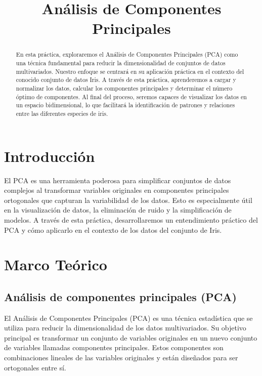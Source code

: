 \documentclass[conference]{IEEEtran}
\title{Análisis de Componentes Principales}
\author{
\IEEEauthorblockN{Portilla Posadas F. D.\textsuperscript{1}}
\IEEEauthorblockA{
\textit{Ingeniería en Inteligencia Artificial} \\
\textit{Unidad Profesional Interdisciplinaria de Ingeniería, Campus Tlaxcala, Instituto Politécnico Nacional}\\
Tlaxacala, México\\
fportillap2100@alumno.ipn.mx
}
}
\begin{document}
\maketitle

\begin{abstract}
    En esta práctica, exploraremos el Análisis de Componentes Principales (PCA) como una técnica fundamental para reducir la dimensionalidad de conjuntos de datos multivariados. Nuestro enfoque se centrará en su aplicación práctica en el contexto del conocido conjunto de datos Iris. A través de esta práctica, aprenderemos a cargar y normalizar los datos, calcular los componentes principales y determinar el número óptimo de componentes. Al final del proceso, seremos capaces de visualizar los datos en un espacio bidimensional, lo que facilitará la identificación de patrones y relaciones entre las diferentes especies de iris.
\end{abstract}

\section{Introducción}

El PCA es una herramienta poderosa para simplificar conjuntos de datos complejos al transformar variables originales en componentes principales ortogonales que capturan la variabilidad de los datos. Esto es especialmente útil en la visualización de datos, la eliminación de ruido y la simplificación de modelos. A través de esta práctica, desarrollaremos un entendimiento práctico del PCA y cómo aplicarlo en el contexto de los datos del conjunto de Iris.

\section{Marco Teórico}

\subsection{Análisis de componentes principales (PCA)}
El Análisis de Componentes Principales (PCA) es una técnica estadística que se utiliza para reducir la dimensionalidad de los datos multivariados. Su objetivo principal es transformar un conjunto de variables originales en un nuevo conjunto de variables llamadas componentes principales. Estos componentes son combinaciones lineales de las variables originales y están diseñados para ser ortogonales entre sí.
\end{document}

